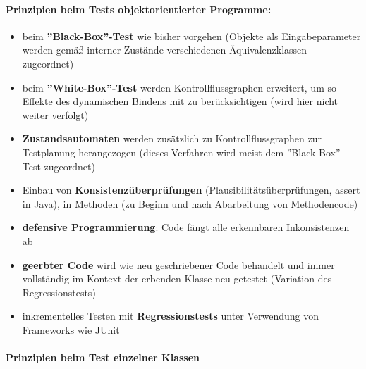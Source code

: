 \paragraph{Prinzipien beim Tests objektorientierter Programme:}
\begin{itemize}
	\item beim \textbf{''Black-Box''-Test} wie bisher vorgehen (Objekte als Eingabeparameter werden gemäß interner Zustände verschiedenen Äquivalenzklassen zugeordnet)
	\item beim \textbf{''White-Box''-Test} werden Kontrollflussgraphen erweitert, um so Effekte des dynamischen Bindens mit zu berücksichtigen (wird hier nicht weiter verfolgt)
	\item \textbf{Zustandsautomaten} werden zusätzlich zu Kontrollflussgraphen zur Testplanung herangezogen (dieses Verfahren wird meist dem ''Black-Box''-Test zugeordnet)
	\item Einbau von \textbf{Konsistenzüberprüfungen} (Plausibilitätsüberprüfungen, assert in Java), in Methoden (zu Beginn und nach Abarbeitung von Methodencode)
	\item \textbf{defensive Programmierung}: Code fängt alle erkennbaren Inkonsistenzen ab
	\item \textbf{geerbter Code} wird wie neu geschriebener Code behandelt und immer vollständig im Kontext der erbenden Klasse neu getestet (Variation des Regressionstests)
	\item inkrementelles Testen mit \textbf{Regressionstests} unter Verwendung von Frameworks wie JUnit
\end{itemize}

\paragraph{Prinzipien beim Test einzelner Klassen}

